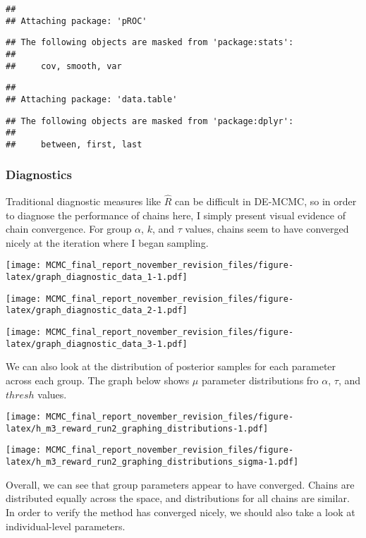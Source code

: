 \documentclass[]{article}
\begin{document}
\begin{verbatim}
## 
## Attaching package: 'pROC'
\end{verbatim}

\begin{verbatim}
## The following objects are masked from 'package:stats':
## 
##     cov, smooth, var
\end{verbatim}

\begin{verbatim}
## 
## Attaching package: 'data.table'
\end{verbatim}

\begin{verbatim}
## The following objects are masked from 'package:dplyr':
## 
##     between, first, last
\end{verbatim}

\subsubsection{Diagnostics}\label{diagnostics}

Traditional diagnostic measures like \(\hat{R}\) can be difficult in
DE-MCMC, so in order to diagnose the performance of chains here, I
simply present visual evidence of chain convergence. For group
\(\alpha\), \(k\), and \(\tau\) values, chains seem to have converged
nicely at the iteration where I began sampling.

\texttt{[image: MCMC\_final\_report\_november\_revision\_files/figure-latex/graph\_diagnostic\_data\_1-1.pdf]}

\texttt{[image: MCMC\_final\_report\_november\_revision\_files/figure-latex/graph\_diagnostic\_data\_2-1.pdf]}

\texttt{[image: MCMC\_final\_report\_november\_revision\_files/figure-latex/graph\_diagnostic\_data\_3-1.pdf]}

We can also look at the distribution of posterior samples for each
parameter across each group. The graph below shows \(\mu\) parameter
distributions fro \(\alpha\), \(\tau\), and \(thresh\) values.

\texttt{[image: MCMC\_final\_report\_november\_revision\_files/figure-latex/h\_m3\_reward\_run2\_graphing\_distributions-1.pdf]}

\texttt{[image: MCMC\_final\_report\_november\_revision\_files/figure-latex/h\_m3\_reward\_run2\_graphing\_distributions\_sigma-1.pdf]}

Overall, we can see that group parameters appear to have converged.
Chains are distributed equally across the space, and distributions for
all chains are similar. In order to verify the method has converged
nicely, we should also take a look at individual-level parameters.
\end{document}
